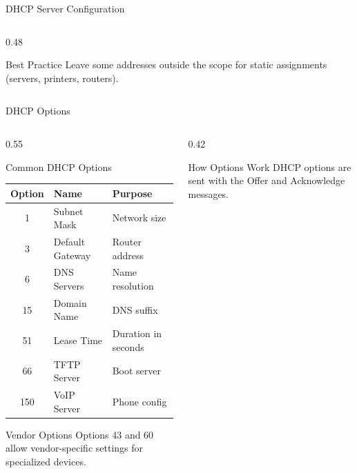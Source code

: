 \documentclass[aspectratio=169]{beamer}  %
\begin{document}
\begin{frame}{DHCP Server Configuration}
\begin{columns}[T]
\begin{column}{0.48\textwidth}
            \vspace{0.2em}
            \begin{alertblock}{Best Practice}
                \small
                Leave some addresses outside the scope for static assignments (servers, printers, routers).
            \end{alertblock}
        \end{column}
    \end{columns}
\end{frame}

\begin{frame}{DHCP Options}
    \begin{columns}[T]
        \begin{column}{0.55\textwidth}
            \begin{block}{Common DHCP Options}
                \small
                \begin{tabular}{c l l}
                    \toprule
                    \textbf{Option} & \textbf{Name} & \textbf{Purpose} \\
                    \midrule
                    1 & Subnet Mask & Network size \\
                    3 & Default Gateway & Router address \\
                    6 & DNS Servers & Name resolution \\
                    15 & Domain Name & DNS suffix \\
                    51 & Lease Time & Duration in seconds \\
                    66 & TFTP Server & Boot server \\
                    150 & VoIP Server & Phone config \\
                    \bottomrule
                \end{tabular}
            \end{block}
            
            \vspace{0.2em}
            \begin{exampleblock}{Vendor Options}
                \small
                Options 43 and 60 allow vendor-specific settings for specialized devices.
            \end{exampleblock}
        \end{column}
        \begin{column}{0.42\textwidth}
            \begin{block}{How Options Work}
                \small
                DHCP options are sent with the Offer and Acknowledge messages.
                

\end{block}
\end{column}
\end{columns}
\end{frame}
\end{document}
